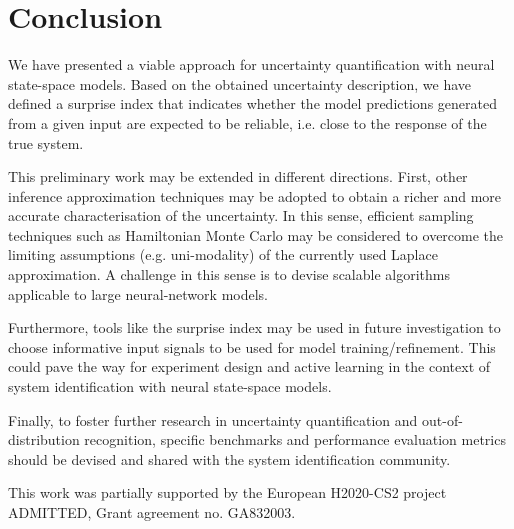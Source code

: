 \documentclass{ifacconf}
\begin{document}
\section{Conclusion}
We have presented a viable approach for uncertainty quantification with neural state-space models. Based on the obtained uncertainty description, we have defined a surprise index that indicates whether the model predictions generated from a given input are expected to be reliable, i.e. close to the response of the true system.

This preliminary work may be extended in different directions. First, other inference approximation techniques may be adopted to obtain a richer and more accurate characterisation of the uncertainty. In this sense, efficient sampling techniques such as Hamiltonian Monte Carlo may be considered to overcome the limiting assumptions (e.g. uni-modality) of the currently used Laplace approximation. A challenge in this sense is to devise scalable algorithms applicable to large neural-network models.

Furthermore, tools like the surprise index may be used in future investigation to {choose} informative input signals to be used for model training/refinement. 
This could pave the way for experiment design and active learning in the context of system identification with neural state-space models.

Finally, to foster further research in uncertainty quantification and out-of-distribution recognition, specific benchmarks and performance evaluation metrics should be devised and shared with the system identification community.

\begin{ack}
This work was partially supported by the European H2020-CS2 project ADMITTED, Grant agreement no. GA832003.
\end{ack}

                           
\end{document}

